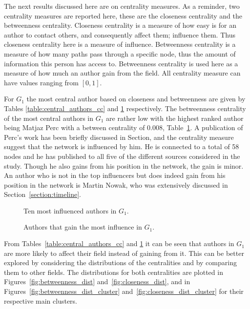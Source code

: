 \documentclass{article}
\theoremstyle{definition}
\begin{document}
The next results discussed here are on centrality measures. As a reminder,
two centrality measures are reported here, these are the closeness centrality
and the betweenness centrality. Closeness centrality is a measure of how
easy is for an author to contact others, and consequently affect them; influence them.
Thus closeness centrality here is a measure of influence. Betweenness centrality
is a measure of how many paths pass through a specific node, thus the amount
of information this person has access to. Betweenness centrality is used here
as a measure of how much an author gain from the field. All centrality measure
can have values ranging from \([0, 1]\).

For \(G_1\)
the most central author based on closeness and betweenness are given by Tables
\ref{table:central_authors_cc} and \ref{table:central_authors} respectively.
The betweenness centrality of the
most central authors in \(G_1\) are rather low with the highest ranked author
being Matjaz Perc with a between centrality of 0.008, Table~\ref{table:central_authors}.
A publication of Perc's work has been briefly discussed in
Section, and the centrality measure suggest that the network is influenced by him.
He is connected to a total of 58 nodes and he has published to all five of the different
sources considered in the study. Though he also gains from his position
in the network, the gain is minor. An author who is not in the top influencers but
does indeed gain from his position in the network is Martin Nowak, who was
extensively discussed in Section~\ref{section:timeline}.

\begin{figure}[H]
    \centering
    \begin{minipage}{.45\textwidth}
        \centering
        
        \caption{Ten most influenced authors in \(G_1\).}\label{table:central_authors_cc}
    \end{minipage}%
    \begin{minipage}{.45\textwidth}
        \centering
        
        \caption{Authors that gain the most influence in \(G_1\).}\label{table:central_authors}
    \end{minipage}
\end{figure}

From Tables~\ref{table:central_authors_cc} and \ref{table:central_authors} it
can be seen that authors in \(G_1\) are more likely to affect their field instead
of gaining from it. This can be better explored by considering the distributions
of the centralities and by comparing them to other fields.
The distributions for both centralities are
plotted in Figures~\ref{fig:betweenness_dist} and~\ref{fig:closeness_dist}, and
in Figures~\ref{fig:betweenness_dist_cluster} and~\ref{fig:closeness_dist_cluster}
for their respective main clusters.
\end{document}
